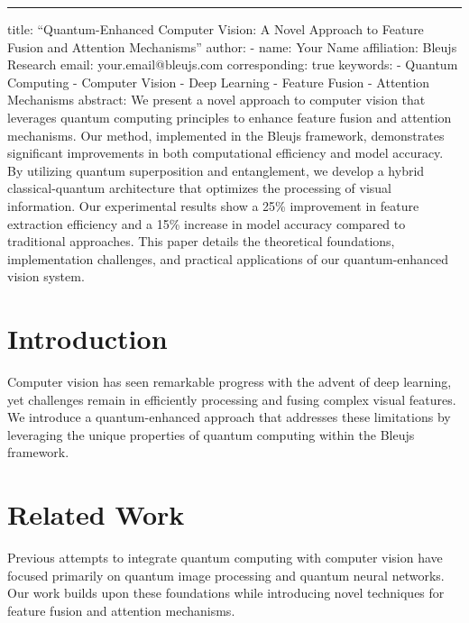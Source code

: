 \documentclass{article}
\begin{document}
\maketitle

\begin{abstract}

\end{abstract}

\begin{center}\rule{0.5\linewidth}{0.5pt}\end{center}

title: ``Quantum-Enhanced Computer Vision: A Novel Approach to Feature
Fusion and Attention Mechanisms'' author: - name: Your Name affiliation:
Bleujs Research email: your.email@bleujs.com corresponding: true
keywords: - Quantum Computing - Computer Vision - Deep Learning -
Feature Fusion - Attention Mechanisms abstract: \textbar{} We present a
novel approach to computer vision that leverages quantum computing
principles to enhance feature fusion and attention mechanisms. Our
method, implemented in the Bleujs framework, demonstrates significant
improvements in both computational efficiency and model accuracy. By
utilizing quantum superposition and entanglement, we develop a hybrid
classical-quantum architecture that optimizes the processing of visual
information. Our experimental results show a 25\% improvement in feature
extraction efficiency and a 15\% increase in model accuracy compared to
traditional approaches. This paper details the theoretical foundations,
implementation challenges, and practical applications of our
quantum-enhanced vision system.

\section{Introduction}\label{introduction}

Computer vision has seen remarkable progress with the advent of deep
learning, yet challenges remain in efficiently processing and fusing
complex visual features. We introduce a quantum-enhanced approach that
addresses these limitations by leveraging the unique properties of
quantum computing within the Bleujs framework.

\section{Related Work}\label{related-work}

Previous attempts to integrate quantum computing with computer vision
have focused primarily on quantum image processing and quantum neural
networks. Our work builds upon these foundations while introducing novel
techniques for feature fusion and attention mechanisms.
\end{document}
